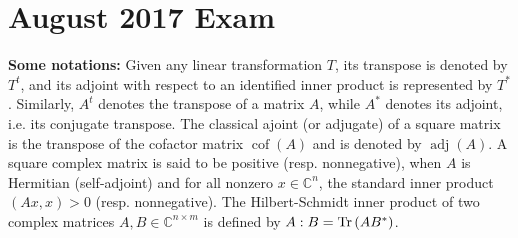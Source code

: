\documentclass[11pt]{article}
\theoremstyle{definition}
\numberwithin{equation}{subsection}
\begin{document}
\newpage
\section{August 2017 Exam}

{\bf Some notations:} Given any linear transformation $T$, its transpose is denoted by $T^t$, and its adjoint with respect to an identified inner product is represented by $T^*$. Similarly, $A^t$ denotes the transpose of a matrix $A$, while $A^*$ denotes its adjoint, i.e. its conjugate transpose. The classical ajoint (or adjugate) of a square matrix is the transpose of the cofactor matrix $\operatorname{cof}(A)$ and is denoted by $\operatorname{adj}(A)$. A square complex matrix is said to be positive (resp. nonnegative), when $A$ is Hermitian (self-adjoint) and for all nonzero $x \in \mathbb{C}^n$, the standard inner product $(Ax, x) > 0$ (resp. nonnegative). The Hilbert-Schmidt inner product of two complex matrices $A, B \in \mathbb{C}^{n \times m}$ is defined by $A : B = \Tr \left(AB^*\right)$.

\medskip
\end{document}
